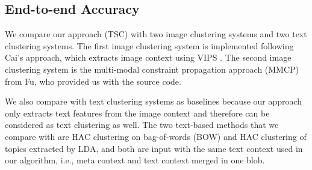 
\subsection{End-to-end Accuracy}
\label{sec:end2end}
We compare our approach (TSC) with
two image clustering systems and two text clustering systems.
The first image clustering system is implemented following
Cai's \cite{Cai2004} approach, which extracts image context
using VIPS \cite{VIPS}.
The second image clustering system is the multi-modal
constraint propagation approach (MMCP) \cite{Fu2011} from Fu,
who provided us with the source code.

We also compare with text clustering systems as baselines because
our approach only extracts text features from the image
context and therefore can be considered as text clustering as well.
The two text-based methods that we compare with are HAC clustering
on bag-of-words (BOW) and HAC clustering of topics extracted by LDA\cite{Blei2003},
and both are input with the same text context used in our algorithm,
i.e., meta context and text context merged in one blob.


